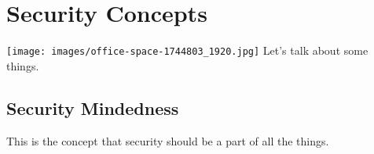 \chapter{Security Concepts}

\texttt{[image: images/office-space-1744803\_1920.jpg]}
\justifying
Let's talk about some things.

\section{Security Mindedness}
\justifying
This is the concept that security should be a part of all the things. 
